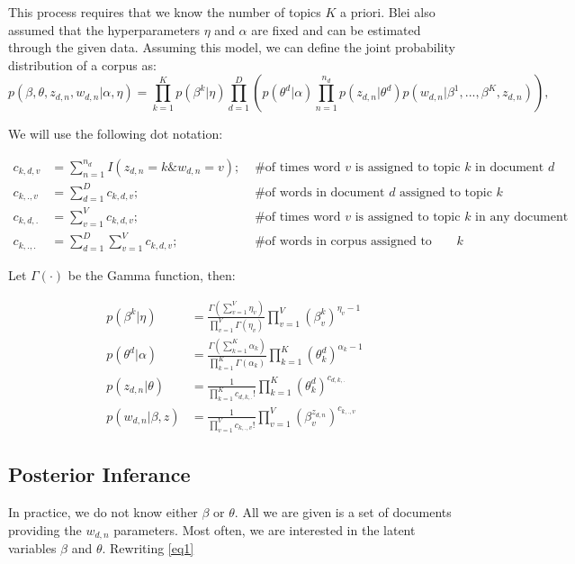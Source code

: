 \documentclass[3p,times]{elsarticle}
\begin{document}
\noindent This process requires that we know the number of topics $K$ a priori. Blei also assumed that the hyperparameters $\eta$ and $\alpha$ are fixed and can be estimated through the given data. Assuming this model, we can define the joint probability distribution of a corpus as:
\begin{equation} \label{eq1}
p(\beta,\theta,z_{d,n},w_{d,n} | \alpha,\eta) = \prod_{k=1}^{K}{p(\beta^{k} | \eta)}  \prod_{d=1}^{D}\left( p(\theta^{d} | \alpha) \prod_{n=1}^{n_{d}}{p(z_{d,n} | \theta^{d})}p(w_{d,n} | \beta^{1},...,\beta^{K},z_{d,n}) \right)  ,
\end{equation}

\noindent We will use the following dot notation:

\begin{align*}
c_{k,d,v}&=\sum_{n=1}^{n_{d}}{I(z_{d,n}=k \& w_{d,n}=v)}; &\text{ \# of times word $v$ is assigned to topic $k$ in document $d$} \\
c_{k,.,v}&=\sum_{d=1}^{D}{c_{k,d,v}}; &\text{ \# of words in document $d$ assigned to topic $k$} \\
c_{k,d,.}&=\sum_{v=1}^{V}{c_{k,d,v}}; &\text{ \# of times word $v$ is assigned to topic $k$ in any document} \\
c_{k,.,.}&=\sum_{d=1}^{D}\sum_{v=1}^{V}{c_{k,d,v}}; &\text{ \# of words in corpus assigned to topic $k$} 
\end{align*}


\noindent Let $\Gamma(\cdot)$ be the Gamma function, then:

\begin{align*}
p(\beta^{k} | \eta) &=\frac{ \Gamma( \sum_{v=1}^{V}{ \eta_{v} } )}{ \prod_{v=1}^{V}{\Gamma(\eta_{v})}}  
\prod_{v=1}^{V}{(\beta^{k}_{v})^{\eta_{v}-1}} \\
p(\theta^{d} | \alpha) &=\frac {\Gamma( \sum_{k=1}^{K}{ \alpha_{k} } )}{ \prod_{k=1}^{K}{\Gamma(\alpha_{k})}}  
\prod_{k=1}^{K}{(\theta^{d}_{k})^{\alpha_{k}-1}} \\
p(z_{d,n} | \theta) &=\frac{1}{\prod_{k=1}^{K}{c_{d,k,.}!}}
\prod_{k=1}^{K}{(\theta^{d}_{k})^{c_{d,k,.}}} \\
p(w_{d,n} | \beta,z) &=\frac{1}{\prod_{v=1}^{V}{c_{k,.,v}!}}\prod_{v=1}^{V}{
(\beta^{z_{d,n}}_{v})^{c_{k,.,v}}}
\end{align*}

\subsection{Posterior Inferance}
\noindent In practice, we do not know either $\beta$ or $\theta$. All we are given is a set of documents providing the $w_{d,n}$ parameters. Most often, we are interested in the latent variables $\beta$ and $\theta$. Rewriting \ref{eq1}
\end{document}
